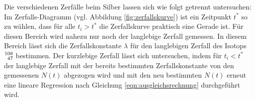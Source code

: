 Die verschiedenen Zerfälle beim Silber lassen sich wie folgt getrennt untersuchen:
Im Zerfalls-Diagramm (vgl. Abbildung \ref{fig:zerfallskurve}) ist ein Zeitpunkt $t^{*}$ so zu wählen, dass für alle $t_i>t^{*}$ die Zerfallskurve praktisch eine Gerade ist.
Für diesen Bereich wird nahezu nur noch der langlebige Zerfall gemessen.
In diesem Bereich lässt sich die Zerfallskonstante $\lambda$ für den langlebigen Zerfall des Isotops $\ce{^{108}_47}$ bestimmen.
Der kurzlebige Zerfall lässt sich untersuchen, indem für $t_i<t^{*}$ der langlebige Zerfall mit der bereits bestimmten Zerfallskonstante von den gemessenen $N(t)$ abgezogen wird und mit den neu bestimmten $N(t)$ erneut eine lineare Regression nach Gleichung \eqref{eqn:ausgleichsrechnung} durchgeführt wird.
